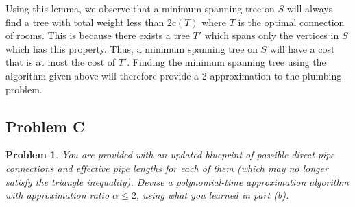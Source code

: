 \documentclass[psamsfonts]{amsart}
\newtheorem{prob}{Problem}[section]
\newenvironment{sol}{{\bfseries Solution}}{\qedsymbol}
\theoremstyle{definition}
\theoremstyle{remark}
\numberwithin{equation}{section}
\begin{document}
\begin{sol}
Using this lemma, we observe that a minimum spanning tree on $S$ will always find a tree with total weight less than $2 c(T)$ where $T$ is the optimal connection of rooms. This is because there exists a tree $T'$ which spans only the vertices in $S$ which has this property. Thus, a minimum spanning tree on $S$ will have a cost that is at most the cost of $T'$. Finding the minimum spanning tree using the algorithm given above will therefore provide a 2-approximation to the plumbing problem.
\end{sol}

\subsection{Problem C}

\begin{prob}
You are provided with an updated blueprint of possible direct pipe connections and effective pipe lengths for each of them (which may no longer satisfy the triangle inequality). Devise a polynomial-time approximation algorithm with approximation ratio $\alpha \leq 2$, using what you learned in part (b). 
\end{prob}
\end{document}

